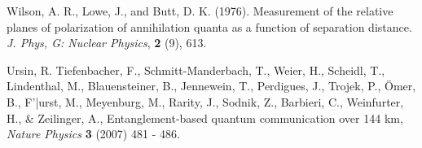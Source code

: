 \documentclass[11pt]{article}
\begin{document}
\begin{thebibliography}{99}
 Wilson, A. R., Lowe, J., and Butt, D. K. (1976). Measurement of the relative planes of polarization of annihilation quanta as a function of separation distance. {\em J. Phys, G: Nuclear Physics}, {\bf 2} (9), 613.

 Ursin, R. Tiefenbacher, F., Schmitt-Manderbach, T., Weier, H., Scheidl, T., Lindenthal, M., Blauensteiner, B., Jennewein, T., Perdigues, J., Trojek, P., \"{O}mer, B., F'|{u}rst, M., Meyenburg, M., Rarity, J., Sodnik, Z.,  Barbieri, C., Weinfurter, H., \&  Zeilinger, A., Entanglement-based quantum communication over 144 km, {\em Nature Physics} {\bf 3} (2007)  481 - 486.

\end{thebibliography}
\end{document}
